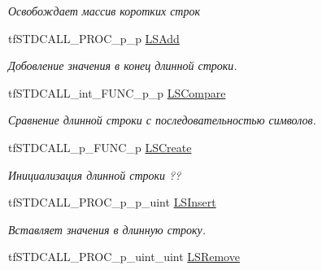 \begin{DoxyCompactItemize}
\begin{DoxyCompactList}\small\item\em Освобождает массив коротких строк \end{DoxyCompactList}\item 
\hypertarget{structs_functions_array_c_p_u_aa45b45f2e1895a4931247cf2bf8b6d86}{tf\-S\-T\-D\-C\-A\-L\-L\-\_\-\-P\-R\-O\-C\-\_\-p\-\_\-p \hyperlink{structs_functions_array_c_p_u_aa45b45f2e1895a4931247cf2bf8b6d86}{L\-S\-Add}}\label{structs_functions_array_c_p_u_aa45b45f2e1895a4931247cf2bf8b6d86}

\begin{DoxyCompactList}\small\item\em Добовление значения в конец длинной строки. \end{DoxyCompactList}\item 
\hypertarget{structs_functions_array_c_p_u_aa97616ef76db5a0e621e259eea2909b7}{tf\-S\-T\-D\-C\-A\-L\-L\-\_\-int\-\_\-\-F\-U\-N\-C\-\_\-p\-\_\-p \hyperlink{structs_functions_array_c_p_u_aa97616ef76db5a0e621e259eea2909b7}{L\-S\-Compare}}\label{structs_functions_array_c_p_u_aa97616ef76db5a0e621e259eea2909b7}

\begin{DoxyCompactList}\small\item\em Сравнение длинной строки с последовательностью символов. \end{DoxyCompactList}\item 
\hypertarget{structs_functions_array_c_p_u_ad2bd5425d3372cfaa029fa0cd3cfaf5f}{tf\-S\-T\-D\-C\-A\-L\-L\-\_\-p\-\_\-\-F\-U\-N\-C\-\_\-p \hyperlink{structs_functions_array_c_p_u_ad2bd5425d3372cfaa029fa0cd3cfaf5f}{L\-S\-Create}}\label{structs_functions_array_c_p_u_ad2bd5425d3372cfaa029fa0cd3cfaf5f}

\begin{DoxyCompactList}\small\item\em Инициализация длинной строки ?? \end{DoxyCompactList}\item 
\hypertarget{structs_functions_array_c_p_u_af0554dfad0ba7d947fb789f5a71b2d86}{tf\-S\-T\-D\-C\-A\-L\-L\-\_\-\-P\-R\-O\-C\-\_\-p\-\_\-p\-\_\-uint \hyperlink{structs_functions_array_c_p_u_af0554dfad0ba7d947fb789f5a71b2d86}{L\-S\-Insert}}\label{structs_functions_array_c_p_u_af0554dfad0ba7d947fb789f5a71b2d86}

\begin{DoxyCompactList}\small\item\em Вставляет значения в длинную строку. \end{DoxyCompactList}\item 
\hypertarget{structs_functions_array_c_p_u_a9cbebcc9d91ce7f8c05652423eadad25}{tf\-S\-T\-D\-C\-A\-L\-L\-\_\-\-P\-R\-O\-C\-\_\-p\-\_\-uint\-\_\-uint \hyperlink{structs_functions_array_c_p_u_a9cbebcc9d91ce7f8c05652423eadad25}{L\-S\-Remove}}\label{structs_functions_array_c_p_u_a9cbebcc9d91ce7f8c05652423eadad25}


\end{DoxyCompactItemize}
